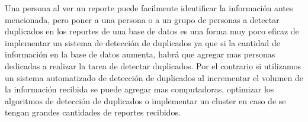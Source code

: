 Una persona al ver un reporte puede facilmente identificar la informaci\'{o}n antes mencionada, pero poner a una persona o a un grupo de personas a detectar duplicados en los reportes de una base de datos es una forma muy poco eficaz de implementar un sistema de detecci\'{o}n de duplicados ya que si la cantidad de informaci\'{o}n en la base de datos aumenta, habr\'{a} que agregar mas personas dedicadas a realizar la tarea de detectar duplicados. Por el contrario si utilizamos un sistema automatizado de detecci\'{o}n de duplicados al incrementar el volumen de la informaci\'{o}n recibida se puede agregar mas computadoras, optimizar los algoritmos de detecci\'{o}n de duplicados o implementar un cluster en caso de se tengan grandes cantidades de reportes recibidos. 

